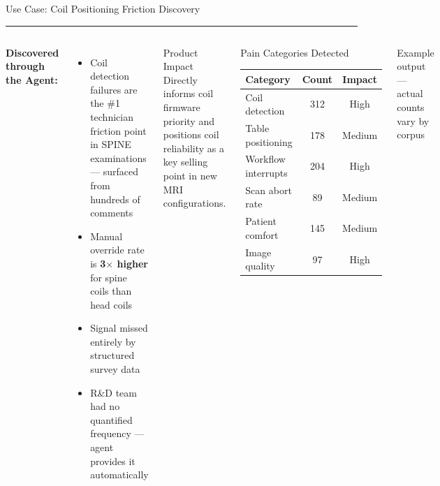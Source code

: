 \documentclass[aspectratio=169,12pt]{beamer}
\newcommand{\tealsep}{\vspace{1pt}\textcolor{SiemensTeal}{\rule{\linewidth}{1pt}}\vspace{4pt}}
\begin{document}
\begin{frame}[shrink=8]{Use Case: Coil Positioning Friction Discovery}
\tealsep
\begin{columns}[T]
\textbf{Discovered through the Agent:}
\vspace{6pt}
\begin{itemize}\setlength\itemsep{6pt}
  \item \alert{Coil detection failures} are the \#1 technician friction point in SPINE examinations — surfaced from hundreds of comments
  \item Manual override rate is \textbf{3$\times$ higher} for spine coils than head coils
  \item Signal missed entirely by structured survey data
  \item R\&D team had no quantified frequency — agent provides it automatically
\end{itemize}

\vspace{10pt}
\begin{exampleblock}{Product Impact}
  Directly informs coil firmware priority and positions coil reliability as a key selling point in new MRI configurations.
\end{exampleblock}

\vspace{4pt}
\begin{block}{Pain Categories Detected}
  \begin{tabular}{lcc}
    \toprule
    Category & Count & Impact \\
    \midrule
    Coil detection & 312 & High \\
    Table positioning & 178 & Medium \\
    Workflow interrupts & 204 & High \\
    Scan abort rate & 89 & Medium \\
    Patient comfort & 145 & Medium \\
    Image quality & 97 & High \\
    \bottomrule
  \end{tabular}
\end{block}
\vspace{4pt}
\textcolor{SiemensMuted}{\footnotesize Example output — actual counts vary by corpus}
\end{columns}
\end{frame}
\end{document}
